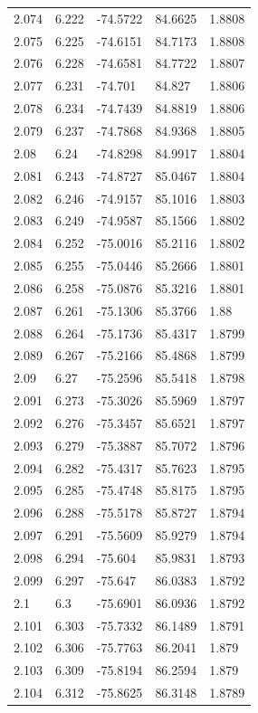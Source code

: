 \begin{tabular}{lllll}
2.074 & 6.222 & -74.5722 & 84.6625 & 1.8808 \\
2.075 & 6.225 & -74.6151 & 84.7173 & 1.8808 \\
2.076 & 6.228 & -74.6581 & 84.7722 & 1.8807 \\
2.077 & 6.231 & -74.701 & 84.827 & 1.8806 \\
2.078 & 6.234 & -74.7439 & 84.8819 & 1.8806 \\
2.079 & 6.237 & -74.7868 & 84.9368 & 1.8805 \\
2.08 & 6.24 & -74.8298 & 84.9917 & 1.8804 \\
2.081 & 6.243 & -74.8727 & 85.0467 & 1.8804 \\
2.082 & 6.246 & -74.9157 & 85.1016 & 1.8803 \\
2.083 & 6.249 & -74.9587 & 85.1566 & 1.8802 \\
2.084 & 6.252 & -75.0016 & 85.2116 & 1.8802 \\
2.085 & 6.255 & -75.0446 & 85.2666 & 1.8801 \\
2.086 & 6.258 & -75.0876 & 85.3216 & 1.8801 \\
2.087 & 6.261 & -75.1306 & 85.3766 & 1.88 \\
2.088 & 6.264 & -75.1736 & 85.4317 & 1.8799 \\
2.089 & 6.267 & -75.2166 & 85.4868 & 1.8799 \\
2.09 & 6.27 & -75.2596 & 85.5418 & 1.8798 \\
2.091 & 6.273 & -75.3026 & 85.5969 & 1.8797 \\
2.092 & 6.276 & -75.3457 & 85.6521 & 1.8797 \\
2.093 & 6.279 & -75.3887 & 85.7072 & 1.8796 \\
2.094 & 6.282 & -75.4317 & 85.7623 & 1.8795 \\
2.095 & 6.285 & -75.4748 & 85.8175 & 1.8795 \\
2.096 & 6.288 & -75.5178 & 85.8727 & 1.8794 \\
2.097 & 6.291 & -75.5609 & 85.9279 & 1.8794 \\
2.098 & 6.294 & -75.604 & 85.9831 & 1.8793 \\
2.099 & 6.297 & -75.647 & 86.0383 & 1.8792 \\
2.1 & 6.3 & -75.6901 & 86.0936 & 1.8792 \\
2.101 & 6.303 & -75.7332 & 86.1489 & 1.8791 \\
2.102 & 6.306 & -75.7763 & 86.2041 & 1.879 \\
2.103 & 6.309 & -75.8194 & 86.2594 & 1.879 \\
2.104 & 6.312 & -75.8625 & 86.3148 & 1.8789 \\

\end{tabular}
